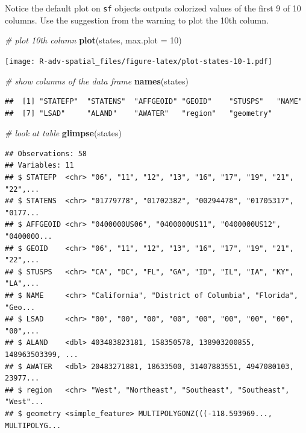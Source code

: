 \documentclass[]{book}
\newenvironment{Shaded}{\begin{snugshade}}{\end{snugshade}}
\newcommand{\KeywordTok}[1]{\textcolor[rgb]{0.13,0.29,0.53}{\textbf{{#1}}}}
\newcommand{\DataTypeTok}[1]{\textcolor[rgb]{0.13,0.29,0.53}{{#1}}}
\newcommand{\DecValTok}[1]{\textcolor[rgb]{0.00,0.00,0.81}{{#1}}}
\newcommand{\CommentTok}[1]{\textcolor[rgb]{0.56,0.35,0.01}{\textit{{#1}}}}
\newcommand{\NormalTok}[1]{{#1}}
\theoremstyle{definition}
\theoremstyle{definition}
\theoremstyle{definition}
\theoremstyle{remark}
\begin{document}
Notice the default plot on \texttt{sf} objects outputs colorized values
of the first 9 of 10 columns. Use the suggestion from the warning to
plot the 10th column.

\begin{Shaded}
\begin{Highlighting}[]
\CommentTok{# plot 10th column}
\KeywordTok{plot}\NormalTok{(states, }\DataTypeTok{max.plot =} \DecValTok{10}\NormalTok{)}
\end{Highlighting}
\end{Shaded}

\texttt{[image: R-adv-spatial\_files/figure-latex/plot-states-10-1.pdf]}

\begin{Shaded}
\begin{Highlighting}[]
\CommentTok{# show columns of the data frame}
\KeywordTok{names}\NormalTok{(states)}
\end{Highlighting}
\end{Shaded}

\begin{verbatim}
##  [1] "STATEFP"  "STATENS"  "AFFGEOID" "GEOID"    "STUSPS"   "NAME"    
##  [7] "LSAD"     "ALAND"    "AWATER"   "region"   "geometry"
\end{verbatim}

\begin{Shaded}
\begin{Highlighting}[]
\CommentTok{# look at table}
\KeywordTok{glimpse}\NormalTok{(states)}
\end{Highlighting}
\end{Shaded}

\begin{verbatim}
## Observations: 58
## Variables: 11
## $ STATEFP  <chr> "06", "11", "12", "13", "16", "17", "19", "21", "22",...
## $ STATENS  <chr> "01779778", "01702382", "00294478", "01705317", "0177...
## $ AFFGEOID <chr> "0400000US06", "0400000US11", "0400000US12", "0400000...
## $ GEOID    <chr> "06", "11", "12", "13", "16", "17", "19", "21", "22",...
## $ STUSPS   <chr> "CA", "DC", "FL", "GA", "ID", "IL", "IA", "KY", "LA",...
## $ NAME     <chr> "California", "District of Columbia", "Florida", "Geo...
## $ LSAD     <chr> "00", "00", "00", "00", "00", "00", "00", "00", "00",...
## $ ALAND    <dbl> 403483823181, 158350578, 138903200855, 148963503399, ...
## $ AWATER   <dbl> 20483271881, 18633500, 31407883551, 4947080103, 23977...
## $ region   <chr> "West", "Northeast", "Southeast", "Southeast", "West"...
## $ geometry <simple_feature> MULTIPOLYGONZ(((-118.593969..., MULTIPOLYG...
\end{verbatim}
\end{document}
